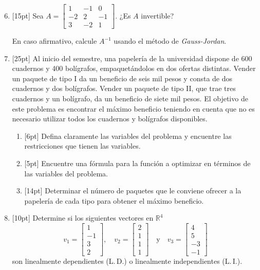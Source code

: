\documentclass[11pt]{article}
\begin{document}
\begin{enumerate}
\setcounter{enumi}{5}
\item{}[15pt] Sea $A = \begin{bmatrix}1&-1&0\\-2&2&-1\\3&-2&1\end{bmatrix}$. ¿Es $A$ invertible?

En caso afirmativo, calcule $A^{-1}$ usando el método de \textit{Gauss-Jordan}.

\vspace{6cm}

\item{}[25pt] Al inicio del semestre, una papelería de la universidad dispone de 600 cuadernos y 400 bolígrafos, empaquetándolos en dos ofertas distintas. Vender un paquete de tipo I da un beneficio de seis mil pesos y consta de dos cuadernos y dos bolígrafos. Vender un paquete de tipo II, que trae tres cuadernos y un bolígrafo, da un beneficio de siete mil pesos. El objetivo de este problema es encontrar el máximo beneficio teniendo en cuenta que no es necesario utilizar todos los cuadernos y bolígrafos disponibles.
\begin{enumerate}
\item{}[6pt] Defina claramente las variables del problema y encuentre las restricciones que tienen las variables.

\vspace{5cm}

\item{}[5pt] Encuentre una fórmula para la función a optimizar en términos de las variables del problema.

\vspace{3cm}

\item{}[14pt] Determinar el número de paquetes que le conviene ofrecer a la papelería de cada tipo para obtener el máximo beneficio.

\vspace{6cm}
\end{enumerate}

\item{}[10pt] Determine si los siguientes vectores en $\mathbb{R}^4$
\[
v_1 = \begin{bmatrix}1\\-1\\3\\2\end{bmatrix},\quad v_2 = \begin{bmatrix}2\\1\\1\\1\end{bmatrix} \quad \text{y} \quad v_3 = \begin{bmatrix}4\\5\\-3\\-1\end{bmatrix}
\]
son linealmente dependientes (L.\,D.) o linealmente independientes (L.\,I.).


\end{enumerate}
\end{document}
